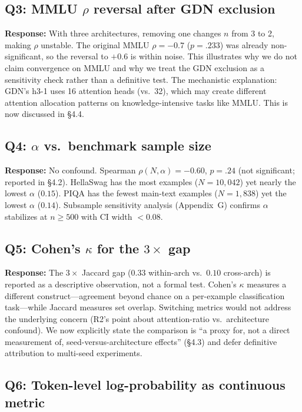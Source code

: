 \documentclass[11pt]{article}
\newcommand{\response}[1]{\textcolor{responsecolor}{\textbf{Response:} #1}}
\begin{document}
\subsection*{Q3: MMLU $\rho$ reversal after GDN exclusion}

\response{With three architectures, removing one changes $n$ from 3 to 2, making $\rho$ unstable. The original MMLU $\rho = -0.7$ ($p = .233$) was already non-significant, so the reversal to $+0.6$ is within noise. This illustrates why we do not claim convergence on MMLU and why we treat the GDN exclusion as a sensitivity check rather than a definitive test. The mechanistic explanation: GDN's h3-1 uses 16 attention heads (vs.\ 32), which may create different attention allocation patterns on knowledge-intensive tasks like MMLU. This is now discussed in \S4.4.}

\subsection*{Q4: $\alpha$ vs.\ benchmark sample size}

\response{No confound. Spearman $\rho(N, \alpha) = -0.60$, $p = .24$ (not significant; reported in \S4.2). HellaSwag has the most examples ($N = 10{,}042$) yet nearly the lowest $\alpha$ ($0.15$). PIQA has the fewest main-text examples ($N = 1{,}838$) yet the lowest $\alpha$ ($0.14$). Subsample sensitivity analysis (Appendix~G) confirms $\alpha$ stabilizes at $n \geq 500$ with CI width $< 0.08$.}

\subsection*{Q5: Cohen's $\kappa$ for the $3\times$ gap}

\response{The $3\times$ Jaccard gap ($0.33$ within-arch vs.\ $0.10$ cross-arch) is reported as a descriptive observation, not a formal test. Cohen's $\kappa$ measures a different construct---agreement beyond chance on a per-example classification task---while Jaccard measures set overlap. Switching metrics would not address the underlying concern (R2's point about attention-ratio vs.\ architecture confound). We now explicitly state the comparison is ``a proxy for, not a direct measurement of, seed-versus-architecture effects'' (\S4.3) and defer definitive attribution to multi-seed experiments.}

\subsection*{Q6: Token-level log-probability as continuous metric}
\end{document}
